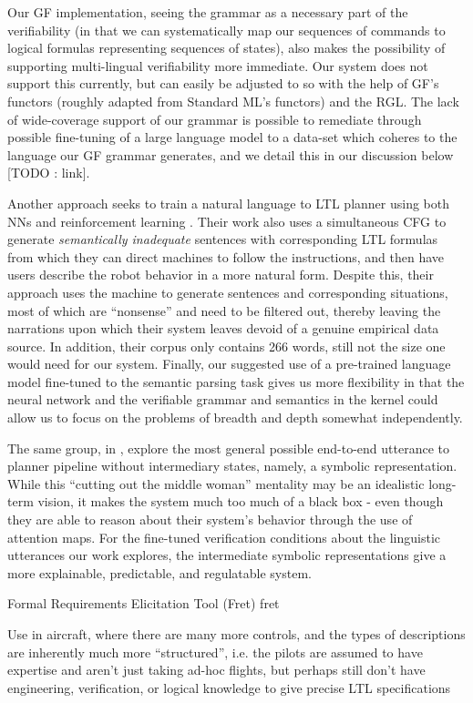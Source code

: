 \documentclass[a4paper, 11pt]{article}
\begin{document}
Our GF implementation, seeing the grammar as a necessary part of the
verifiability (in that we can systematically map our sequences of commands to
logical formulas representing sequences of states), also makes the possibility of
supporting multi-lingual verifiability more immediate. Our system does not
support this currently, but can easily be adjusted to so with the help of GF's
functors (roughly adapted from Standard ML's functors) and the RGL. The lack of wide-coverage
support of our grammar is possible to remediate through possible fine-tuning of
a large language model to a data-set which coheres to the language our GF
grammar generates, and we detail this in our discussion below [TODO : link].

Another approach seeks to train a natural language to LTL planner using both NNs
and reinforcement learning \cite{ltlSemParse}. Their work also uses a
simultaneous CFG to generate \emph{semantically inadequate} sentences with
corresponding LTL formulas from which they can direct machines to follow the
instructions, and then have users describe the robot behavior in a more natural
form. Despite this, their approach uses the machine to generate sentences and
corresponding situations, most of which are ``nonsense'' and need to be filtered
out, thereby leaving the narrations upon which their system leaves devoid of a
genuine empirical data source. In addition, their corpus only contains 266
words, still not the size one would need for our system. Finally, our suggested
use of a pre-trained language model fine-tuned to the semantic parsing task
gives us more flexibility in that the neural network and the verifiable grammar
and semantics in the kernel could allow us to focus on the problems of breadth
and depth somewhat independently.

The same group, in \cite{kuo2020deep}, explore the most general possible
end-to-end utterance to planner pipeline without intermediary states, namely, a
symbolic representation. While this ``cutting out the middle woman'' mentality
may be an idealistic long-term vision, it makes the system much too much of a
black box - even though they are able to reason about their system's behavior
through the use of attention maps. For the fine-tuned verification conditions
about the linguistic utterances our work explores, the intermediate symbolic
representations give a more explainable, predictable, and regulatable system.


Formal Requirements Elicitation Tool (Fret) {fret}

Use in aircraft, where there are many more controls, and the types of
descriptions are inherently much more ``structured'', i.e. the pilots are
assumed to have expertise and aren't just taking ad-hoc flights, but perhaps
still don't have engineering, verification, or logical knowledge to give precise
LTL specifications
\end{document}
